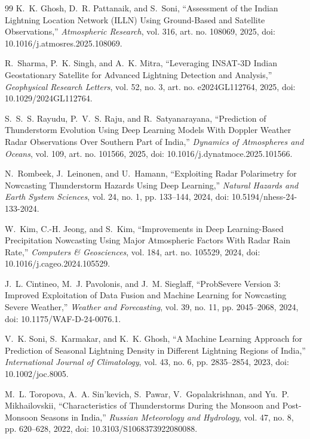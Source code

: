 \documentclass[12pt,a4paper]{report}
\begin{document}
\begin{thebibliography}{99}
K.~K. Ghosh, D.~R. Pattanaik, and S.~Soni, ``Assessment of the Indian Lightning Location Network (ILLN) Using Ground-Based and Satellite Observations,'' \emph{Atmospheric Research}, vol. 316, art. no. 108069, 2025, doi: 10.1016/j.atmosres.2025.108069.

R.~Sharma, P.~K. Singh, and A.~K. Mitra, ``Leveraging INSAT-3D Indian Geostationary Satellite for Advanced Lightning Detection and Analysis,'' \emph{Geophysical Research Letters}, vol. 52, no. 3, art. no. e2024GL112764, 2025, doi: 10.1029/2024GL112764.

S.~S.~S. Rayudu, P.~V.~S. Raju, and R.~Satyanarayana, ``Prediction of Thunderstorm Evolution Using Deep Learning Models With Doppler Weather Radar Observations Over Southern Part of India,'' \emph{Dynamics of Atmospheres and Oceans}, vol. 109, art. no. 101566, 2025, doi: 10.1016/j.dynatmoce.2025.101566.

N.~Rombeek, J.~Leinonen, and U.~Hamann, ``Exploiting Radar Polarimetry for Nowcasting Thunderstorm Hazards Using Deep Learning,'' \emph{Natural Hazards and Earth System Sciences}, vol. 24, no. 1, pp. 133--144, 2024, doi: 10.5194/nhess-24-133-2024.

W.~Kim, C.-H. Jeong, and S.~Kim, ``Improvements in Deep Learning-Based Precipitation Nowcasting Using Major Atmospheric Factors With Radar Rain Rate,'' \emph{Computers \& Geosciences}, vol. 184, art. no. 105529, 2024, doi: 10.1016/j.cageo.2024.105529.

J.~L. Cintineo, M.~J. Pavolonis, and J.~M. Sieglaff, ``ProbSevere Version 3: Improved Exploitation of Data Fusion and Machine Learning for Nowcasting Severe Weather,'' \emph{Weather and Forecasting}, vol. 39, no. 11, pp. 2045--2068, 2024, doi: 10.1175/WAF-D-24-0076.1.

V.~K. Soni, S.~Karmakar, and K.~K. Ghosh, ``A Machine Learning Approach for Prediction of Seasonal Lightning Density in Different Lightning Regions of India,'' \emph{International Journal of Climatology}, vol. 43, no. 6, pp. 2835--2854, 2023, doi: 10.1002/joc.8005.

M.~L. Toropova, A.~A. Sin'kevich, S.~Pawar, V.~Gopalakrishnan, and Yu.~P. Mikhailovskii, ``Characteristics of Thunderstorms During the Monsoon and Post-Monsoon Seasons in India,'' \emph{Russian Meteorology and Hydrology}, vol. 47, no. 8, pp. 620--628, 2022, doi: 10.3103/S1068373922080088.


\end{thebibliography}
\end{document}
